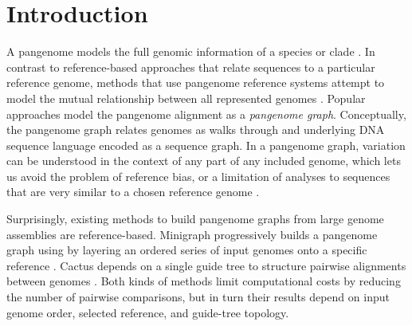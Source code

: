 \documentclass{bioinfo}
\theoremstyle{definition}
\begin{document}
\maketitle


\section{Introduction}
\label{sec:introduction}
A pangenome models the full genomic information of a species or clade \citep{Medini_2005,Sherman_2020}.
In contrast to reference-based approaches that relate sequences to a particular reference genome, methods that use pangenome reference systems attempt to model the mutual relationship between all represented genomes \citep{cpang2018}.
Popular approaches model the pangenome alignment as a \textit{pangenome graph}.
Conceptually, the pangenome graph relates genomes as walks through and underlying DNA sequence language encoded as a sequence graph. 
In a pangenome graph, variation can be understood in the context of any part of any included genome, which lets us avoid the problem of reference bias, or a limitation of analyses to sequences that are very similar to a chosen reference genome \cite{Eizenga_2020}.

Surprisingly, existing methods to build pangenome graphs from large genome assemblies are reference-based.
Minigraph progressively builds a pangenome graph using by layering an ordered series of input genomes onto a specific reference \citep{Li:2020}.
Cactus depends on a single guide tree to structure pairwise alignments between genomes \citep{Armstrong:2020}.
Both kinds of methods limit computational costs by reducing the number of pairwise comparisons, but in turn their results depend on input genome order, selected reference, and guide-tree topology.
\end{document}
